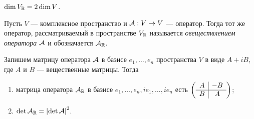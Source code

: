\begin{corollary}
    $\dim V_{\mathbb{R}} = 2\dim V$.
\end{corollary}

\begin{definition}
    Пусть $V$ --- комплексное пространство и $\mathcal{A}: V \to V$ --- оператор. Тогда тот же оператор, рассматриваемый в пространстве $V_{\mathbb{R}}$ называется \textit{овеществлением оператора} $\mathcal{A}$ и обозначается $\mathcal{A}_{\mathbb{R}}$.
\end{definition}

\begin{proposal}
    Запишем матрицу оператора $\mathcal{A}$ в базисе $e_1, \ldots, e_n$ пространства $V$ в виде $A + iB$, где $A$ и $B$ --- вещественные матрицы. Тогда
    \begin{enumerate}[nolistsep]
        \item матрица оператора $\mathcal{A}_{\mathbb{R}}$ в базисе $e_1, \ldots, e_n, ie_1, \ldots, ie_n$ есть
            $
            \left(
            \begin{array}{c | c}
                A & -B\\
                \hline
                B & A
            \end{array}
            \right)
            $;
        \item $\det\mathcal{A}_{\mathbb{R}} = \left\lvert\det\mathcal{A}\right\rvert^2$.
    \end{enumerate}
\end{proposal}

